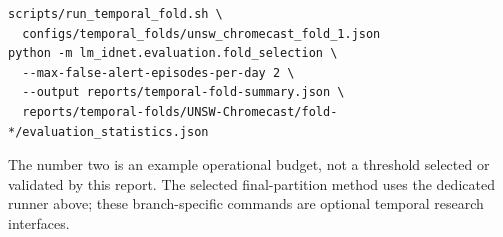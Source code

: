 \begin{verbatim}
scripts/run_temporal_fold.sh \
  configs/temporal_folds/unsw_chromecast_fold_1.json
python -m lm_idnet.evaluation.fold_selection \
  --max-false-alert-episodes-per-day 2 \
  --output reports/temporal-fold-summary.json \
  reports/temporal-folds/UNSW-Chromecast/fold-*/evaluation_statistics.json
\end{verbatim}

The number two is an example operational budget, not a threshold selected or
validated by this report. The selected final-partition method uses the dedicated runner above; these
branch-specific commands are optional temporal research interfaces.
